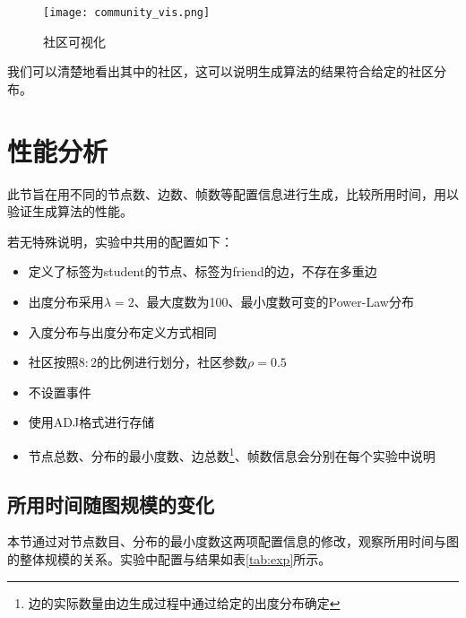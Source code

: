 \begin{figure}[H]
  \centering
  \texttt{[image: community\_vis.png]}
  \caption{社区可视化}
  \label{fig:community_vis}
\end{figure}

我们可以清楚地看出其中的社区，这可以说明生成算法的结果符合给定的社区分布。

\section{性能分析}

此节旨在用不同的节点数、边数、帧数等配置信息进行生成，比较所用时间，用以验证生成算法的性能。

若无特殊说明，实验中共用的配置如下：

\begin{itemize}
  \item 定义了标签为student的节点、标签为friend的边，不存在多重边
  \item 出度分布采用$\lambda=2$、最大度数为100、最小度数可变的Power-Law分布
  \item 入度分布与出度分布定义方式相同
  \item 社区按照$8:2$的比例进行划分，社区参数$\rho=0.5$
  \item 不设置事件
  \item 使用ADJ格式进行存储
  \item 节点总数、分布的最小度数、边总数\footnote{边的实际数量由边生成过程中通过给定的出度分布确定}、帧数信息会分别在每个实验中说明
\end{itemize}

\subsection{所用时间随图规模的变化}

本节通过对节点数目、分布的最小度数这两项配置信息的修改，观察所用时间与图的整体规模的关系。实验中配置与结果如表\ref{tab:exp}所示。

